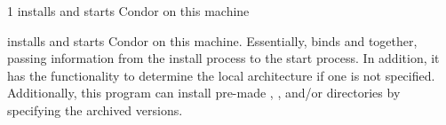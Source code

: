 \begin{ManPage}{\label{man-condor-cold-start}}{1}
{installs and starts Condor on this machine}

\Synopsis {}


\Description

 installs and starts Condor on this machine.
Essentially,  binds  and
 together, passing information from the install
process to the start process.  In addition, it has the functionality
to determine the local architecture if one is not specified.
Additionally, this program can install pre-made ,
, and/or
 directories by specifying the archived versions.


\end{ManPage}
